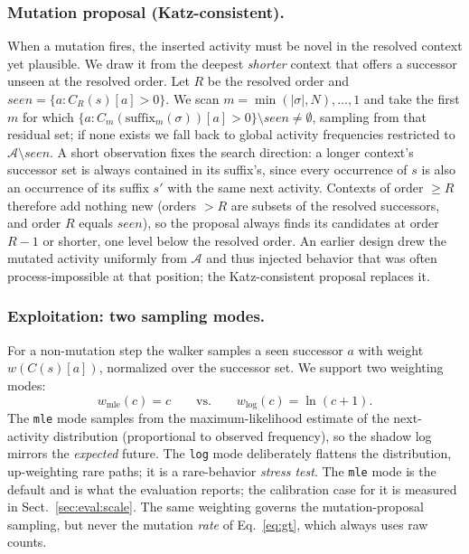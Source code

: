 \documentclass[runningheads]{llncs}
\newcommand{\chg}[1]{\textcolor{chgblue}{#1}}
\begin{document}
\subsubsection{Mutation proposal (Katz-consistent).}
When a mutation fires, the inserted activity must be novel in the resolved context yet plausible. We draw it from the deepest \emph{shorter} context that offers a successor unseen at the resolved order. Let $R$ be the resolved order and $\mathit{seen}=\{a:C_R(s)[a]>0\}$. We scan $m=\min(|\sigma|,N),\dots,1$ and take the first $m$ for which $\{a:C_m(\mathrm{suffix}_m(\sigma))[a]>0\}\setminus\mathit{seen}\neq\emptyset$, sampling from that residual set; if none exists we fall back to global activity frequencies restricted to $\mathcal{A}\setminus\mathit{seen}$. A short observation fixes the search direction: a longer context's successor set is always contained in its suffix's, since every occurrence of $s$ is also an occurrence of its suffix $s'$ with the same next activity. Contexts of order $\ge R$ therefore add nothing new (orders $>R$ are subsets of the resolved successors, and order $R$ equals $\mathit{seen}$), so the proposal always finds its candidates at order $R{-}1$ or shorter, one level below the resolved order. \chg{An earlier design drew the mutated activity uniformly from $\mathcal{A}$ and thus injected behavior that was often process-impossible at that position; the Katz-consistent proposal replaces it.}

\subsubsection{Exploitation: two sampling modes.}
For a non-mutation step the walker samples a seen successor $a$ with weight $w(C(s)[a])$, normalized over the successor set. We support two weighting modes:
\begin{equation}
w_{\mathrm{mle}}(c)=c \qquad\text{vs.}\qquad w_{\mathrm{log}}(c)=\ln(c+1).
\end{equation}
The \texttt{mle} mode samples from the maximum-likelihood estimate of the next-activity distribution (proportional to observed frequency), so the shadow log mirrors the \emph{expected} future. The \texttt{log} mode deliberately flattens the distribution, up-weighting rare paths; it is a rare-behavior \emph{stress test}. \chg{The \texttt{mle} mode is the default and is what the evaluation reports; the calibration case for it is measured in Sect.~\ref{sec:eval:scale}.} The same weighting governs the mutation-proposal sampling, but never the mutation \emph{rate} of Eq.~\eqref{eq:gt}, which always uses raw counts.
\end{document}

